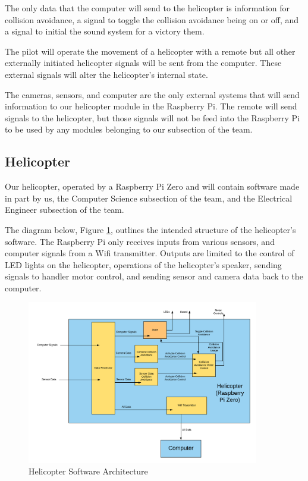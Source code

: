 \documentclass[onecolumn, draftclsnofoot, 10pt, compsoc]{IEEEtran}
\begin{document}
The only data that the computer will send to the helicopter is information for collision avoidance, a signal to toggle the collision avoidance being on or off, and a signal to initial the sound system for a victory them.

The pilot will operate the movement of a helicopter with a remote but all other externally initiated helicopter signals will be sent from the computer. These external signals will alter the helicopter's internal state.

The cameras, sensors, and computer are the only external systems that will send information to our helicopter module in the Raspberry Pi. The remote will send signals to the helicopter, but those signals will not be feed into the Raspberry Pi to be used by any modules belonging to our subsection of the team.

\subsection{Helicopter}
Our helicopter, operated by a Raspberry Pi Zero and will contain software made in part by us, the Computer Science subsection of the team, and the Electrical Engineer subsection of the team.

The diagram below, Figure \ref{fig:HelicopterSoftwareArchitecture}, outlines the intended structure of the helicopter's software. The Raspberry Pi only receives inputs from various sensors, and computer signals from a Wifi transmitter. Outputs are limited to the control of LED lights on the helicopter, operations of the helicopter's speaker, sending signals to handler motor control, and sending sensor and camera data back to the computer.

\begin{figure}[h]
    \centering
    \includegraphics[width=0.9\textwidth]{graphics/helicopter_diagram.png}
    \caption{Helicopter Software Architecture}
    \label{fig:HelicopterSoftwareArchitecture}
\end{figure}
\end{document}
